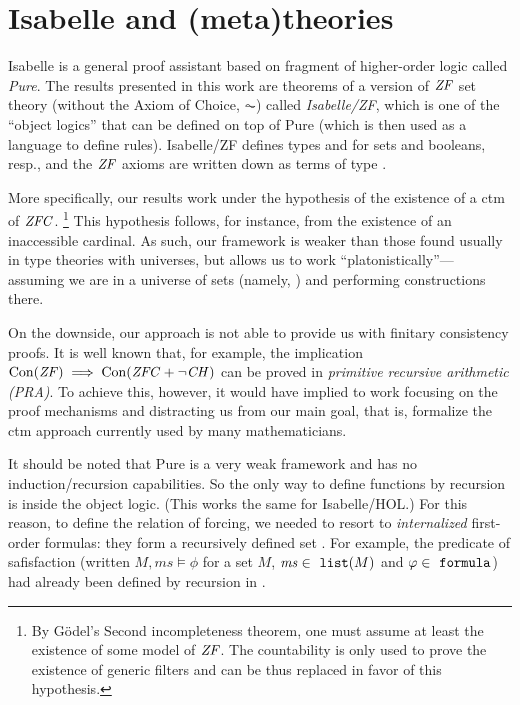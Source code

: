 \section{Isabelle and (meta)theories}
\label{sec:isabelle-metatheories}

Isabelle \cite{Isabelle,DBLP:books/sp/Paulson94} is a general proof
assistant based on fragment of higher-order logic called
\emph{Pure}. 
The results presented in this work are theorems of a
version of $\mathit{ZF}$ set theory (without the Axiom of Choice, $\AC$) 
called \emph{Isabelle/ZF}, which is one of the
``object logics'' that can be defined on top of Pure (which is then
used as a language to define rules). Isabelle/ZF defines types
 and  for sets and booleans, resp., and the $\mathit{ZF}$
axioms are written down as terms of type .

More specifically, our results work under the hypothesis of
the existence of a ctm of $\mathit{ZFC}$.%
\footnote{By Gödel's Second incompleteness theorem, one must assume at
  least the existence of some model of $\mathit{ZF}$. 
  The countability is only used to prove the existence of
  generic filters and can be thus replaced in favor of this
  hypothesis.} 
This hypothesis follows, for instance, from the existence of an
inaccessible cardinal. As such, our framework is weaker than those
found usually in type theories with universes, but allows us to work
``platonistically''--- assuming we are in a universe of sets (namely,
) and performing constructions there.

On the downside, our approach is not able to provide us with finitary
consistency proofs. It is well known that, for example, the
implication $\operatorname{Con}(\mathit{ZF}) \implies \operatorname{Con}(\mathit{ZFC}+\neg\mathit{CH})$ can be proved in
\emph{primitive recursive arithmetic (PRA)}. To achieve this, however,
it would have implied to work focusing on the proof mechanisms
and distracting us from our main goal, that is, formalize the ctm
approach currently used by many mathematicians.

It should be noted that Pure is a very weak framework and has no
induction/recursion capabilities. So the only way to define functions
by recursion is inside the object logic. (This works the same for
Isabelle/HOL.) For this reason, to define the relation of forcing, we
needed to resort to \emph{internalized} first-order formulas: they
form a recursively defined set . For example, the
predicate of safisfaction
(written $M,\mathit{ms}\models\phi$ for a set $M$,
$\mathit{ms}\in\isatt{list}(M)$ and $\phi\in\formula$)
had already been defined by recursion in \cite{paulson_2003}.

